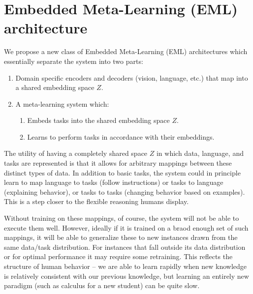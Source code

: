 \documentclass{article}
\begin{document}
\section{Embedded Meta-Learning (EML) architecture}
We propose a new class of Embedded Meta-Learning (EML) architectures which essentially separate the system into two parts: 
\begin{enumerate}
\item Domain specific encoders and decoders (vision, language, etc.) that map into a shared embedding space $Z$.
\item A meta-learning system which:
    \begin{enumerate}
    \item Embeds tasks into the shared embedding space $Z$.
    \item Learns to perform tasks in accordance with their embeddings.
    \end{enumerate}
\end{enumerate}
The utility of having a completely shared space $Z$ in which data, language, and tasks are represented is that it allows for arbitrary mappings between these distinct types of data. In addition to basic tasks, the system could in principle learn to map language to tasks (follow instructions) or tasks to language (explaining behavior), or tasks to tasks (changing behavior based on examples). This is a step closer to the flexible reasoning humans display. \par
Without training on these mappings, of course, the system will not be able to execute them well. However, ideally if it is trained on a braod enough set of such mappings, it will be able to generalize these to new instances drawn from the same data/task distribution. For instances that fall outside its data distribution or for optimal performance it may require some retraining. This reflects the structure of human behavior -- we are able to learn rapidly when new knowledge is relatively consistent with our previous knowledge, but learning an entirely new paradigm (such as calculus for a new student) can be quite slow. \par 
\end{document}

